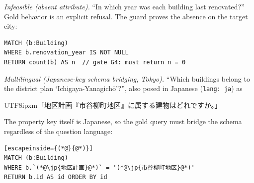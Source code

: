 \documentclass[sigconf,authordraft]{acmart}
\newcommand{\jp}[1]{\begin{CJK}{UTF8}{ipxm}#1\end{CJK}}
\begin{document}
\emph{Infeasible (absent attribute).} ``In which year was each building last renovated?'' Gold behavior is an explicit refusal. The guard proves the absence on the target city:
\begin{lstlisting}
MATCH (b:Building)
WHERE b.renovation_year IS NOT NULL
RETURN count(b) AS n  // gate G4: must return n = 0
\end{lstlisting}

\emph{Multilingual (Japanese-key schema bridging, Tokyo).} ``Which buildings belong to the district plan `Ichigaya-Yanagich\=o'?'', also posed in Japanese (\texttt{lang: ja}) as \jp{「地区計画『市谷柳町地区』に属する建物はどれですか。」} The property key itself is Japanese, so the gold query must bridge the schema regardless of the question language:
\begin{lstlisting}[escapeinside={(*@}{@*)}]
MATCH (b:Building)
WHERE b.`(*@\jp{地区計画}@*)` = '(*@\jp{市谷柳町地区}@*)'
RETURN b.id AS id ORDER BY id
\end{lstlisting}


\end{document}
